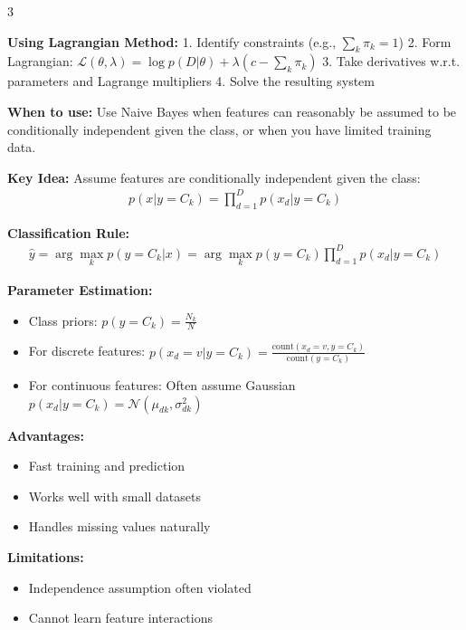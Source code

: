 \documentclass[10pt,landscape]{article}
\begin{document}
\begin{multicols}{3}
\begin{tcolorbox}[breakable, title=2.2 Generative Models for Classification, colback=classification,boxsep=1pt,left=1pt,right=1pt,top=1pt,bottom=1pt]
\textbf{Using Lagrangian Method:}
1. Identify constraints (e.g., $\sum_{k}\pi_k = 1$)
2. Form Lagrangian: 
   $\mathcal{L}(\theta, \lambda) = \log p(D|\theta) + \lambda(c - \sum_{k}\pi_k)$
3. Take derivatives w.r.t. parameters and Lagrange multipliers
4. Solve the resulting system
\end{tcolorbox}

\begin{tcolorbox}[breakable, title=2.3 Naive Bayes, colback=classification,boxsep=1pt,left=1pt,right=1pt,top=1pt,bottom=1pt]
\textbf{When to use:} Use Naive Bayes when features can reasonably be assumed to be conditionally independent given the class, or when you have limited training data.

\textbf{Key Idea:} Assume features are conditionally independent given the class:
\begin{align}
p(x|y=C_k) = \prod_{d=1}^D p(x_d|y=C_k)
\end{align}

\textbf{Classification Rule:}
\begin{align}
\hat{y} = \arg\max_k p(y=C_k|x) = \arg\max_k p(y=C_k)\prod_{d=1}^D p(x_d|y=C_k)
\end{align}

\textbf{Parameter Estimation:}
\begin{itemize}[leftmargin=*,noitemsep,topsep=0pt]
    \item Class priors: $p(y=C_k) = \frac{N_k}{N}$
    \item For discrete features: $p(x_d=v|y=C_k) = \frac{\text{count}(x_d=v, y=C_k)}{\text{count}(y=C_k)}$
    \item For continuous features: Often assume Gaussian $p(x_d|y=C_k) = \mathcal{N}(\mu_{dk}, \sigma_{dk}^2)$
\end{itemize}

\textbf{Advantages:}
\begin{itemize}[leftmargin=*,noitemsep,topsep=0pt]
    \item Fast training and prediction
    \item Works well with small datasets
    \item Handles missing values naturally
\end{itemize}

\textbf{Limitations:}
\begin{itemize}[leftmargin=*,noitemsep,topsep=0pt]
    \item Independence assumption often violated
    \item Cannot learn feature interactions
\end{itemize}
\end{tcolorbox}


\end{multicols}
\end{document}
